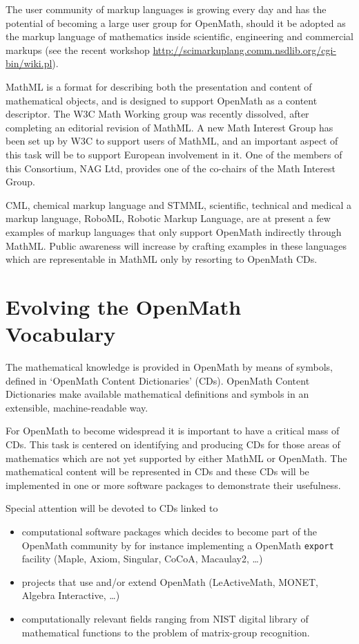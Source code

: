 \documentclass[draft]{artikel3}
\begin{document}
The user community of markup languages is growing every day and has
the potential of becoming a large user group for OpenMath, should it
be adopted as the markup language of mathematics inside scientific,
engineering and commercial markups (see the recent workshop
\url{http://scimarkuplang.comm.nsdlib.org/cgi-bin/wiki.pl}).

MathML is a format for describing both the presentation and content of
mathematical objects, and is designed to support OpenMath as a content
descriptor.  The W3C Math Working group was recently dissolved, after
completing an editorial revision of MathML.  A new Math Interest Group
has been set up by W3C to support users of MathML, and an important
aspect of this task will be to support European involvement in it.
One of the members of this Consortium, NAG Ltd, provides one of the
co-chairs of the Math Interest Group.

CML, chemical markup language and STMML, scientific, technical and
medical a markup language, RoboML, Robotic Markup Language, are at
present a few examples of markup languages that only support OpenMath
indirectly through MathML.  Public awareness will increase by crafting
examples in these languages which are representable in MathML only by
resorting to OpenMath CDs.

\section{Evolving the OpenMath Vocabulary}
\label{sec:OCD}

The mathematical knowledge is provided in OpenMath by means of
symbols, defined in `OpenMath Content Dictionaries' (CDs).  OpenMath
Content Dictionaries make available mathematical definitions and
symbols in an extensible, machine-readable way.

For OpenMath to become widespread it is important to have a critical
mass of CDs. This task is centered on identifying and producing CDs
for those areas of mathematics which are not yet supported by either
MathML or OpenMath. The mathematical content will be represented in
CDs and these CDs will be implemented in one or more software packages
to demonstrate their usefulness.

Special attention will be devoted to CDs linked to 
\begin{itemize}
  
\item computational software packages which decides to become part of
  the OpenMath community by for instance implementing a OpenMath
  \texttt{export} facility (Maple, Axiom, Singular, CoCoA, Macaulay2,
  \ldots)
  
\item projects that use and/or extend OpenMath (LeActiveMath, MONET,
  Algebra Interactive, \ldots)
  
\item computationally relevant fields ranging from NIST digital
  library of mathematical functions to the problem of matrix-group
  recognition.

\end{itemize}
\end{document}
